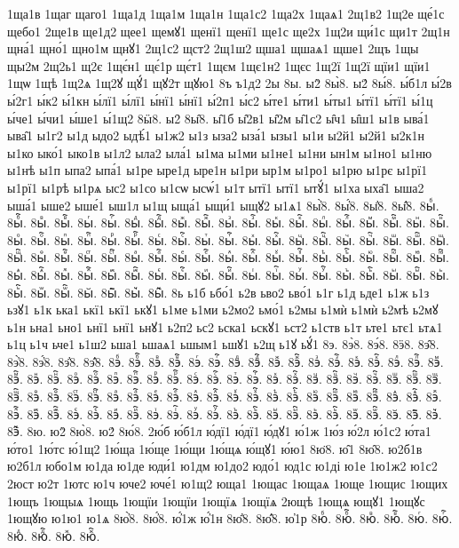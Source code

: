 {1ща1в
1щаг
щаго1
1ща1д
1ща1м
1ща1н
1ща1с2
1ща2х
1щаѧ1
2щ1в2
1щ2е
ще́1с
щебо1
2ще1в
ще1д2
щее1
щемꙋ1
щенї1
щенї1
ще1с
ще2х
1щ2и
щи́1с
щи1т
2щ1н
щна́1
щно́1
щно1м
щнꙋ1
2щ1с2
щст2
2щ1ш2
щша1
щшаѧ1
щше1
2щъ
1щы
щы2м
2щ2ь1
щ2є
1щє́н1
щє́1р
щє́т1
1щєм
1щє1н2
1щєс
1щ2ї
1щ2ї
щїи1
щїи1
1щѡ
1щѣ
1щ2ѧ
1щ2ꙋ
щꙋ́1
щꙋ2т
щꙋю1
8ъ
ъ1д2
2ы
8ы.
ы2̀
8ы̀8.
ы2́
8ы́8.
ы́б1л
ы́2в
ы́2г1
ы́к2
ы́1кн
ы́лї1
ы́лї1
ы́нї1
ы́нї1
ы́2п1
ы́с2
ы́те1
ы́ти1
ы́ты1
ы́тї1
ы́тї1
ы́1ц
ы́че1
ы́чи1
ы́ше1
ы́1щ2
8ӹ8.
ы2̑
8ы̑8.
ы̑1б
ы̑2в1
ы̑2м
ы̑1с2
ы̑ч1
ы̑ш1
ы1в
ыва́1
ыва̑1
ы1г2
ы1д
ыдо2
ыдѣ́1
ы1ж2
ы1з
ыза2
ыза́1
ызы1
ы1и
ы2й1
ы2й1
ы2к1н
ы1ко
ыко́1
ыко1в
ы1л2
ыла2
ыла́1
ы1ма
ы1ми
ы1не1
ы1ни
ын1м
ы1но1
ы1ню
ы1нѣ
ы1п
ыпа2
ыпа́1
ы1ре
ыре1д
ыре1н
ы1ри
ыр1м
ы1ро1
ы1рю
ы1рє
ы1рї1
ы1рї1
ы1рѣ
ы1рѧ
ыс2
ы1со
ы1сѡ
ысѡ́1
ы1т
ытї1
ытї1
ытꙋ́1
ы1ха
ыха̑1
ыша2
ыша́1
ыше2
ыше́1
ыш1л
ы1щ
ыща́1
ыщи́1
ыщꙋ2
ы1ѧ1
8ы҆̀8.
8ы҆́8.
8ы҆̈8.
8ы҆̑8.
8ыⷠ.
8ыⷠ҇.
8ыⷡ.
8ыⷡ҇.
8ыⷢ.
8ыⷢ҇.
8ыⷣ.
8ыⷣ҇.
8ыⷤ.
8ыⷤ҇.
8ыⷥ.
8ыⷥ҇.
8ыⷦ.
8ыⷦ҇.
8ыⷧ.
8ыⷧ҇.
8ыⷨ.
8ыⷨ҇.
8ыⷩ.
8ыⷩ҇.
8ыⷪ.
8ыⷪ҇.
8ыⷫ.
8ыⷫ҇.
8ыⷬ.
8ыⷬ҇.
8ыⷭ.
8ыⷭ҇.
8ыⷮ.
8ыⷮ҇.
8ыⷯ.
8ыⷯ҇.
8ыⷰ.
8ыⷰ҇.
8ыⷱ.
8ыⷱ҇.
8ыⷲ.
8ыⷲ҇.
8ыⷳ.
8ыⷳ҇.
8ыⷴ.
8ыⷴ҇.
8ыⷵ.
8ыⷵ҇.
8ыⷶ.
8ыⷶ҇.
8ыⷷ.
8ыⷷ҇.
8ыⷸ.
8ыⷸ҇.
8ыⷹ.
8ыⷹ҇.
8ыⷺ.
8ыⷺ҇.
8ыⷻ.
8ыⷻ҇.
8ыⷼ.
8ыⷼ҇.
8ыⷽ.
8ыⷽ҇.
8ыⷾ.
8ыⷾ҇.
8ыⷿ.
8ыⷿ҇.
8ыꙴ.
8ыꙴ҇.
8ыꙵ.
8ыꙵ҇.
8ыꙶ.
8ыꙶ҇.
8ыꙷ.
8ыꙷ҇.
8ыꙸ.
8ыꙸ҇.
8ыꙹ.
8ыꙹ҇.
8ыꙺ.
8ыꙺ҇.
8ыꙻ.
8ыꙻ҇.
8ы꙼.
8ы꙼҇.
8ы꙽.
8ы꙽҇.
8ь
ь1б
ьбо́1
ь2в
ьво2
ьво́1
ь1г
ь1д
ьде1
ь1ж
ь1з
ьзꙋ1
ь1к
ька1
ькї1
ькї1
ькꙋ1
ь1ме
ь1ми
ь2мо2
ьмо́1
ь2мы
ь1мѝ
ь1мѝ
ь2мѣ
ь2мꙋ
ь1н
ьна1
ьно1
ьнї1
ьнї1
ьнꙋ1
ь2п2
ьс2
ьска1
ьскꙋ1
ьст2
ь1ств
ь1т
ьте1
ьтє1
ьтѧ1
ь1ц
ь1ч
ьче1
ь1ш2
ьша1
ьшаѧ1
ьшым1
ьшꙋ1
ь2щ
ь1ꙋ
ьꙋ́1
8э.
8э̀8.
8э́8.
8ӭ8.
8э̑8.
8э҆̀8.
8э҆́8.
8э҆̈8.
8э҆̑8.
8эⷠ.
8эⷠ҇.
8эⷡ.
8эⷡ҇.
8эⷢ.
8эⷢ҇.
8эⷣ.
8эⷣ҇.
8эⷤ.
8эⷤ҇.
8эⷥ.
8эⷥ҇.
8эⷦ.
8эⷦ҇.
8эⷧ.
8эⷧ҇.
8эⷨ.
8эⷨ҇.
8эⷩ.
8эⷩ҇.
8эⷪ.
8эⷪ҇.
8эⷫ.
8эⷫ҇.
8эⷬ.
8эⷬ҇.
8эⷭ.
8эⷭ҇.
8эⷮ.
8эⷮ҇.
8эⷯ.
8эⷯ҇.
8эⷰ.
8эⷰ҇.
8эⷱ.
8эⷱ҇.
8эⷲ.
8эⷲ҇.
8эⷳ.
8эⷳ҇.
8эⷴ.
8эⷴ҇.
8эⷵ.
8эⷵ҇.
8эⷶ.
8эⷶ҇.
8эⷷ.
8эⷷ҇.
8эⷸ.
8эⷸ҇.
8эⷹ.
8эⷹ҇.
8эⷺ.
8эⷺ҇.
8эⷻ.
8эⷻ҇.
8эⷼ.
8эⷼ҇.
8эⷽ.
8эⷽ҇.
8эⷾ.
8эⷾ҇.
8эⷿ.
8эⷿ҇.
8эꙴ.
8эꙴ҇.
8эꙵ.
8эꙵ҇.
8эꙶ.
8эꙶ҇.
8эꙷ.
8эꙷ҇.
8эꙸ.
8эꙸ҇.
8эꙹ.
8эꙹ҇.
8эꙺ.
8эꙺ҇.
8эꙻ.
8эꙻ҇.
8э꙼.
8э꙼҇.
8э꙽.
8э꙽҇.
8ю.
ю2̀
8ю̀8.
ю2́
8ю́8.
2ю́б
ю́б1л
ю́дї1
ю́дї1
ю́дꙋ1
ю́1ж
1ю́з
ю́2л
ю́1с2
ю́та1
ю́то1
1ю́тс
ю́1щ2
1ю́ща
1ю́ще
1ю́щи
1ю́щѧ
ю́щꙋ1
ю́ю1
8ю̈8.
ю̑1
8ю̑8.
ю2б1в
ю2б1л
юбо1м
ю1да
ю1де
юди́1
ю1дм
ю1до2
юдо́1
юд1с
ю1ді
ю1е
1ю1ж2
ю1с2
2юст
ю2т
1ютс
ю1ч
юче2
юче́1
ю1щ2
юща1
1ющас
1ющаѧ
1юще
1ющис
1ющих
1ющъ
1ющыѧ
1ющь
1ющїи
1ющїи
1ющїѧ
1ющїѧ
2ющѣ
1ющѧ
ющꙋ1
1ющꙋс
1ющꙋю
ю1ю1
ю1ѧ
8ю҆̀8.
8ю҆́8.
ю҆́1ж
ю҆́1н
8ю҆̈8.
8ю҆̑8.
ю҆1р
8юⷠ.
8юⷠ҇.
8юⷡ.
8юⷡ҇.
8юⷢ.
8юⷢ҇.
8юⷣ.
8юⷣ҇.
8юⷤ.
8юⷤ҇.
}

